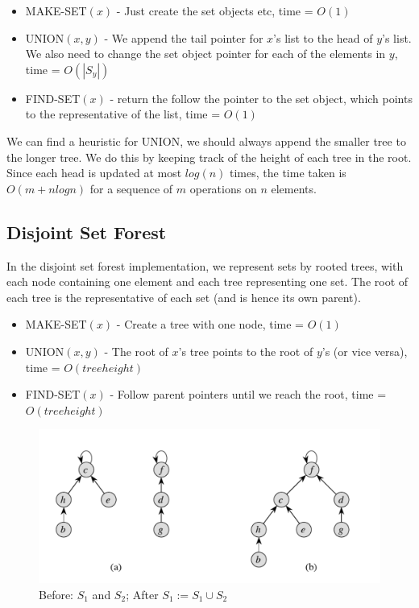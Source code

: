 \documentclass{article}
\theoremstyle{plain}
\theoremstyle{definition}
\begin{document}
        \begin{itemize}
        \item MAKE-SET$(x)$ - Just create the set objects etc, time = $O(1)$
        \item UNION$(x, y)$ - We append the tail pointer for $x$'s list to the head of $y$'s list. We also need to change the set object pointer for each of the elements in $y$, time = $O(|S_y|)$
        \item FIND-SET$(x)$ - return the follow the pointer to the set object, which points to the representative of the list, time = $O(1)$
        \end{itemize}

        We can find a heuristic for UNION, we should always append the smaller tree to the longer tree. We do this by keeping track of the height of each tree in the root. Since each head is updated at most $log(n)$ times, the time taken is $O(m + n log n)$ for a sequence of $m$ operations on $n$ elements. 
        
    \subsection{Disjoint Set Forest}
        In the disjoint set forest implementation, we represent sets by rooted trees, with each node containing one element and each tree representing one set. The root of each tree is the representative of each set (and is hence its own parent).  

        \begin{itemize}
        \item MAKE-SET$(x)$ - Create a tree with one node, time = $O(1)$
        \item UNION$(x, y)$ - The root of $x$'s tree points to the root of $y$'s (or vice versa), time = $O(tree height)$
        \item FIND-SET$(x)$ - Follow parent pointers until we reach the root, time = $O(tree height)$
        \end{itemize}

        \begin{figure}
            \centering
            \includegraphics[width=\linewidth]{images/disjointsetforest.png}
            \caption{Before: $S_1$ and $S_2$; After $S_1 := S_1 \cup S_2$}
            \label{fig:disjointsetforest}
        \end{figure}
\end{document}
